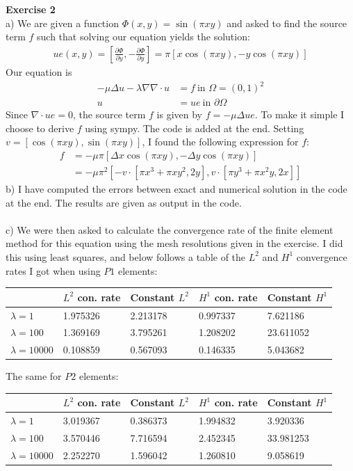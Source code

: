 \documentclass[11pt,a4paper]{report}
\begin{document}
\\
\\
\textbf{Exercise 2}
\\
a) We are given a function $\Phi(x,y)=\sin(\pi xy)$ and asked to find the source term $f$ such that solving our equation yields the solution:
\begin{align*}
ue(x,y)=[\frac{\partial \Phi}{\partial y},-\frac{\partial \Phi}{\partial y}]= \pi[x\cos(\pi xy),-y\cos(\pi xy)]
\end{align*}
Our equation is 
\begin{align*}
-\mu \Delta u -\lambda\nabla\nabla\cdot u &= f \ \text{in } \Omega=(0,1)^2 \\
u&=ue \ \text{in } \partial\Omega
\end{align*}
Since $\nabla\cdot ue=0$, the source term $f$ is given by $f=-\mu \Delta ue$. To make it simple I choose to derive $f$ using sympy. The code is added at the end. Setting $v=[\cos(\pi xy),\sin(\pi xy)]$, I found the following expression for $f$:
\begin{align*}
f &= -\mu\pi[\Delta x\cos(\pi xy),-\Delta y\cos(\pi xy)] \\
&= -\mu\pi^2[-v\cdot [\pi x^3+\pi xy^2,2y],v\cdot [\pi y^3+\pi x^2y,2x]]
\end{align*}
b) I have computed the errors between exact and numerical solution in the code at the end. The results are given as output in the code.
\\
\\
c) We were then asked to calculate the convergence rate of the finite element method for this equation using the mesh resolutions given in the exercise. I did this using least squares, and below follows a table of the $L^2$ and $H^1$ convergence rates I got when using $P1$ elements:
\begin{center}
    \begin{tabular}{| l | l | l | l | l |}
    \hline
     & $L^2$ con. rate& Constant $L^2$ & $H^1$ con. rate& Constant $H^1$\\ \hline
     $\lambda=1$& 1.975326 & 2.213178 & 0.997337& 7.621186 \\ \hline
     $\lambda=100$& 1.369169 & 3.795261& 1.208202& 23.611052\\ \hline
     $\lambda=10000$& 0.108859 & 0.567093 & 0.146335 & 5.043682 \\ \hline
    \end{tabular}
\end{center}
The same for $P2$ elements:
\begin{center}
    \begin{tabular}{| l | l | l | l | l |}
    \hline
    & $L^2$ con. rate& Constant $L^2$ & $H^1$ con. rate& Constant $H^1$\\ \hline
     $\lambda=1$& 3.019367 & 0.386373 & 1.994832& 3.920336 \\ \hline
     $\lambda=100$& 3.570446 & 7.716594 & 2.452345& 33.981253 \\ \hline
     $\lambda=10000$& 2.252270 & 1.596042 & 1.260810& 9.058619 \\ \hline
    \end{tabular}
\end{center}
\end{document}
